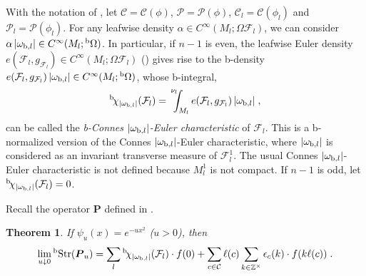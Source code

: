 \documentclass{memo-l}
\theoremstyle{plain}
\newtheorem{thm}{Theorem}[section]
\theoremstyle{definition}
\theoremstyle{remark}
\newcommand{\Z}{\mathbb{Z}}
\newcommand{\CC}{\mathcal{C}}
\newcommand{\FF}{\mathcal{F}}
\newcommand{\PP}{\mathcal{P}}
\newcommand{\bfP}{\boldsymbol{P}}
\newcommand{\Str}{\operatorname{Str}}
\newcommand{\bStr}{{}^{\text{\rm b}}\!\Str}
\newcommand{\bOmega}{{}^{\text{\rm b}}\Omega}
\newcommand{\nulint}{\!\!\!\!\!{\phantom{\int}}^{\nu_l}\!\!\!\!\int}
\newcommand{\bchi}{{}^{\text{\rm b}}\!\chi}
\numberwithin{section}{chapter}
\numberwithin{equation}{section}%
\begin{document}
With the notation of , let $\CC=\CC(\phi)$, $\PP=\PP(\phi)$, $\CC_l=\CC(\phi_l)$ and $\PP_l=\PP(\phi_l)$. For any leafwise density $\alpha\in C^\infty(M_l;\Omega\FF_l)$, we can consider $\alpha\,|\omega_{\text{\rm b},l}|\in C^\infty(M_l;\bOmega)$. In particular, if $n-1$ is even, the leafwise Euler density $e(\FF_l,g_{\FF_l})\in C^\infty(M_l;\Omega\FF_l)$ () gives rise to the b-density $e(\FF_l,g_{\FF_l})\,|\omega_{\text{\rm b},l}|\in C^\infty(M_l;\bOmega)$, whose b-integral,
\[
\bchi_{|\omega_{\text{\rm b},l}|}(\FF_l)=\nulint_{M_l}e(\FF_l,g_{\FF_l})\,|\omega_{\text{\rm b},l}|\;,
\]
can be called the \emph{b-Connes $|\omega_{\text{\rm b},l}|$-Euler characteristic} of $\FF_l$. This is a b-normalized version of the Connes $|\omega_{\text{\rm b},l}|$-Euler characteristic, where $|\omega_{\text{\rm b},l}|$ is considered as an invariant transverse measure of $\FF^1_l$. The usual Connes $|\omega_{\text{\rm b},l}|$-Euler characteristic is not defined because $M^1_l$ is not compact. If $n-1$ is odd, let $\bchi_{|\omega_{\text{\rm b},l}|}(\FF_l)=0$.

Recall the operator $\bfP$ defined in .

\begin{thm}\label{t: lim_u -> 0 bTrs(P_u z)}
If $\psi_u(x)=e^{-ux^2}$ {\rm(}$u>0${\rm)}, then
\[
\lim_{u\downarrow0}\bStr(\bfP_u)=\sum_l\bchi_{|\omega_{\text{\rm b},l}|}(\FF_l)\cdot f(0)+\sum_{c\in\CC}\ell(c)\sum_{k\in\Z^\times}\epsilon_c(k)\cdot f(k\ell(c))\;.
\]
\end{thm}
\end{document}
